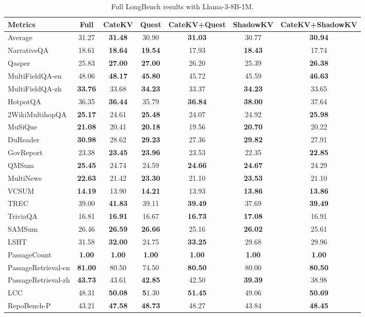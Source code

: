 \begin{table}[t]
\centering
\caption{Full LongBench results with Llama-3-8B-1M.}
\label{tab:transposed-longbench}
\begin{tabular}{l|cc|cc|cc}
\toprule
Metrics & Full & CateKV  & Quest  & CateKV+Quest & ShadowKV & CateKV+ShadowKV  \\ 
\midrule
Average & 31.27 & \textbf{31.48} & 30.90 & \textbf{31.03} & 30.77 & \textbf{30.94} \\
\midrule
NarrativeQA & 18.61 & \textbf{18.64} & \textbf{19.54} & 17.93 & \textbf{18.43} & 17.74 \\
Qasper & 25.83 & \textbf{27.00} & \textbf{27.00} & 26.20 & 25.39 & \textbf{26.38} \\
MultiFieldQA-en & 48.06 & \textbf{48.17} & \textbf{45.80} & 45.72 & 45.59 & \textbf{46.63} \\
MultiFieldQA-zh & \textbf{33.76} & 33.68 & \textbf{34.23} & 33.37 & \textbf{34.23} & 33.65 \\
HotpotQA & 36.35 & \textbf{36.44} & 35.79 & \textbf{36.84} & \textbf{38.00} & 37.64 \\
2WikiMultihopQA & \textbf{25.17} & 24.61 & \textbf{25.48} & 24.07 & 24.92 & \textbf{25.98} \\
MuSiQue & \textbf{21.08} & 20.41 & \textbf{20.18} & 19.56 & \textbf{20.70} & 20.22 \\
DuReader & \textbf{30.98} & 28.62 & \textbf{29.23} & 27.36 & \textbf{29.82} & 27.91 \\
GovReport & 23.38 & \textbf{23.45} & \textbf{23.96} & 23.53 & 22.35 & \textbf{22.85} \\
QMSum & \textbf{25.45} & 24.74 & 24.59 & \textbf{24.66} & \textbf{24.67} & 24.29 \\
MultiNews & \textbf{22.63} & 21.42 & \textbf{23.30} & 21.10 & \textbf{23.53} & 21.10 \\
VCSUM & \textbf{14.19} & 13.90 & \textbf{14.21} & 13.93 & \textbf{13.86} & \textbf{13.86} \\
TREC & 39.00 & \textbf{41.83} & 39.11 & \textbf{39.49} & 37.69 & \textbf{39.49} \\
TriviaQA & 16.81 & \textbf{16.91} & 16.67 & \textbf{16.73} & \textbf{17.08} & 16.91 \\
SAMSum & 26.46 & \textbf{26.59} & \textbf{26.66} & 25.16 & \textbf{26.02} & 25.61 \\
LSHT & 31.58 & \textbf{32.00} & 24.75 & \textbf{33.25} & 29.68 & 29.96 \\
PassageCount & \textbf{1.00} & \textbf{1.00} & \textbf{1.00} & \textbf{1.00} & \textbf{1.00} & \textbf{1.00} \\
PassageRetrieval-en & \textbf{81.00} & 80.50 & 74.50 & \textbf{80.50} & 80.00 & \textbf{80.50} \\
PassageRetrieval-zh & \textbf{43.73} & 43.61 & \textbf{42.85} & 42.50 & \textbf{39.39} & 38.98 \\
LCC & 48.31 & \textbf{50.08} & \textbf51.30 & \textbf{51.45} & 49.06 & \textbf{50.69} \\
RepoBench-P & 43.21 & \textbf{47.58} & \textbf{48.73} & 48.27 & 43.84 & \textbf{48.45} \\
\bottomrule
\end{tabular}
\label{tab:longbench-all}
\end{table}
